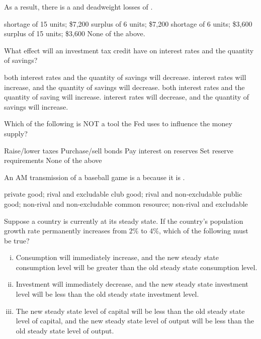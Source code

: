 \documentclass[addpoints,11pt]{exam}
\theoremstyle{definition}
\newcommand{\blank}[0]{\underline{\hspace{3cm}}}
\begin{document}
\begin{questions}
	As a result, there is a \underline{\hspace{3cm}} and deadweight losses of \underline{\hspace{3cm}}.
	
	\begin{choices}
		\choice shortage of 15 units; \$7,200
		\choice surplus of 6 units; \$7,200
		\choice shortage of 6 units; \$3,600
		\choice surplus of 15 units; \$3,600
		\CorrectChoice None of the above.
	\end{choices}
	


	
	\question What effect will an investment tax credit have on interest rates and the quantity of savings?
	
	\begin{choices}
		\choice both interest rates and the quantity of savings will decrease.
		\choice interest rates will increase, and the quantity of savings will decrease.
		\CorrectChoice both interest rates and the quantity of saving will increase. 
		\choice interest rates will decrease, and the quantity of savings will increase.
	\end{choices}
	

	\question Which of the following is NOT a tool the Fed uses to influence the money supply?
	
	\begin{choices}
		\CorrectChoice Raise/lower taxes
		\choice Purchase/sell bonds
		\choice Pay interest on reserves
		\choice Set reserve requirements
		\choice None of the above
	\end{choices}	
	
	\question An AM transmission of a baseball game is a \blank because it is \blank.
	
	\begin{choices}
		\choice private good; rival and excludable
		\choice club good; rival and non-excludable
		\CorrectChoice public good; non-rival and non-excludable
		\choice common resource; non-rival and excludable
	\end{choices}
	
	\question Suppose a country is currently at its steady state. If the country's population growth rate permanently increases from 2\% to 4\%, which of the following must be true?
	
	
	\begin{enumerate}[i.]
		\item Consumption will immediately increase, and the new steady state consumption level will be greater than the old steady state consumption level.
		\item Investment will immediately decrease, and the new steady state investment level will be less than the old steady state investment level.
		\item The new steady state level of capital will be less than the old steady state level of capital, and the new steady state level of output will be less than the old steady state level of output.
	\end{enumerate}
	

\end{questions}
\end{document}
